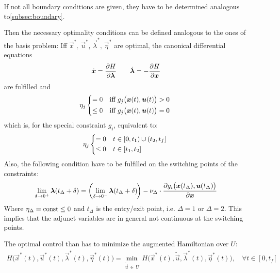 				If not all boundary conditions are given, they have to be determined analogous to\autoref{subsec:boundary}.

				Then the necessary optimality conditions can be defined analogous to the ones of the basis problem: Iff \( \vec{x}^\ast \), \( \vec{u}^\ast \), \( \vec{\lambda}^\ast \), \( \vec{\eta}^\ast \) are optimal, the canonical differential equations
				\begin{align*}
					\dot{\bm{x}} = \pdv{H}{\bm{\lambda}} \qquad \dot{\bm{\lambda}} = -\pdv{H}{\bm{x}}
				\end{align*}
				are fulfilled and
				\begin{align*}
					\eta_j
					\begin{cases*}
						= 0    & iff \( g_j\big(\vec{x}(t), \vec{u}(t)\big) > 0 \) \\
						\leq 0 & iff \( g_j\big(\vec{x}(t), \vec{u}(t)\big) = 0 \)
					\end{cases*}
				\end{align*}
				which is, for the special constraint \(g_i\), equivalent to:
				\begin{align*}
					\eta_j
					\begin{cases*}
						= 0    & \( t \in [0, t_1) \cup (t_2, t_f] \) \\
						\leq 0 & \( t \in [t_1, t_2] \)
					\end{cases*}
				\end{align*}
				Also, the following condition have to be fulfilled on the switching points of the constraints:
				\begin{align*}
					\lim\limits_{\delta \to 0^+} \bm{\lambda}(t_\Delta + \delta) = \bigg(\! \lim\limits_{\delta \to 0^-} \bm{\lambda}(t_\Delta + \delta) \!\bigg) - \nu_\Delta \cdot \pdv{g_i\big(\bm{x}(t_\Delta), \bm{u}(t_\Delta)\big)}{\bm{x}}
				\end{align*}
				Where \( \eta_\Delta = \operatorname{const} \leq 0 \) and \( t_\Delta \) is the entry/exit point, i.e. \( \Delta = 1 \) or \( \Delta = 2 \). This implies that the adjunct variables are in general not continuous at the switching points.

				The optimal control than has to minimize the augmented Hamiltonian over \(U\):
				\begin{align}
					H\big(\vec{x}^\ast(t), \vec{u}^\ast(t), \vec{\lambda}^\ast(t), \vec{\eta}^\ast(t)\big) = \min_{\tilde{\vec{u}} \,\in\, U} \, H\big(\vec{x}^\ast(t), \tilde{\vec{u}}, \vec{\lambda}^\ast(t), \vec{\eta}^\ast(t)\big),\quad \forall t \in [0, t_f]  \label{eq:constrainedMax}
				\end{align}

